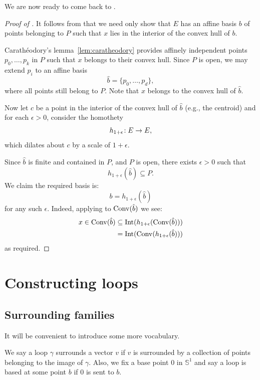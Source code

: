 We are now ready to come back to .

\begin{proof}[Proof of ]
  \leanok
  It follows from  that we need only show that $E$
  has an affine basis $b$ of points belonging to $P$ such that $x$ lies in
  the interior of the convex hull of $b$.

  Carathéodory's lemma~\ref{lem:caratheodory} provides affinely independent
  points $p_0, \dots, p_k$ in $P$ such that $x$ belongs to their convex
  hull. Since $P$ is open, we may extend $p_i$ to an affine basis
  \[
    \hat b = \{p_0, \ldots, p_d\},
  \]
  where all points still belong to $P$.
  Note that $x$ belongs to the convex hull of $\hat b$.

  Now let $c$ be a point in the interior of the convex hull of $\hat b$
  (e.g., the centroid) and for each $\epsilon > 0$, consider the homothety
  \[
    h_{1+\epsilon} \!: E \to E,
  \]
  which dilates about $c$ by a scale of $1 + \epsilon$.

  Since $\hat b$ is finite and contained in $P$, and $P$ is open, there exists
  $\epsilon > 0$ such that
  \[
    h_{1+\epsilon} (\hat b) \subseteq P.
  \]
  We claim the required basis is:
  \[
    b = h_{1+\epsilon} (\hat b)
  \]
  for any such $\epsilon$. Indeed, applying
   to $\operatorname{Conv}(\hat b)$ we see:
  \begin{align*}
    x \in \operatorname{Conv}(\hat b) &\subseteq \operatorname{Int} (h_{1+\epsilon} (\operatorname{Conv}(\hat b)))\\
                  &= \operatorname{Int} (\operatorname{Conv}(h_{1+\epsilon} (\hat b)))
  \end{align*}
  as required.
\end{proof}


\section{Constructing loops}

\subsection{Surrounding families}
\label{sub:surrounding_families}

It will be convenient to introduce some more vocabulary.

\begin{definition}
  \label{def:surrounds}
  \leanok
  We say a loop $γ$ surrounds a vector $v$ if $v$ is surrounded
  by a collection of points belonging to the image of $γ$.
  Also, we fix a base point $0$ in $𝕊^1$ and say a loop is based at some
  point $b$ if $0$ is sent to $b$.
\end{definition}

